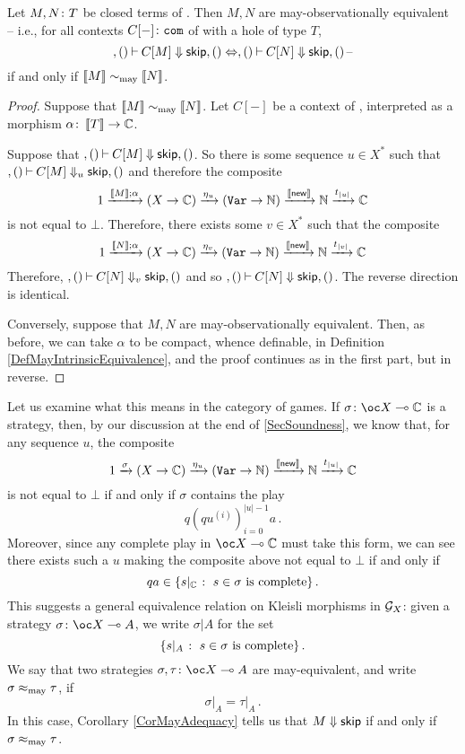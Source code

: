 \documentclass{article}
\begin{document}
\begin{theorem}
  Let $M,N\colon T$ be closed terms of \IAX. Then $M,N$ are may-observationally equivalent -- i.e., for all contexts $C[-]\colon {\mathtt{com}}$ of \IAX with a hole of type $T$, \[
    ,()\mathbin{\vdash} C[M] \Downarrow {\mathsf{skip}},() \Leftrightarrow ,()\mathbin{\vdash} C[N] \Downarrow {\mathsf{skip}},()\,\text{--}
    \]
  if and only if $\left\llbracket M\right\rrbracket \sim_{\operatorname{may}} \left\llbracket N\right\rrbracket$.
\end{theorem}
\begin{proof}
  Suppose that $\left\llbracket M\right\rrbracket\sim_{\operatorname{may}}\left\llbracket N\right\rrbracket$.  
  Let $C[-]$ be a context of \IAX, interpreted as a morphism $\alpha \colon \left\llbracket T\right\rrbracket \to \mathbb{C}$.

  Suppose that $,()\mathbin{\vdash} C[M] \Downarrow {\mathsf{skip}},()$.  
  So there is some sequence $u\in X^*$ such that $,()\mathbin{\vdash} C[M] \Downarrow_u {\mathsf{skip}},()$ and therefore the composite
  \[
    1 \xrightarrow{\left\llbracket M\right\rrbracket;\alpha}
    (X \to \mathbb{C}) \xrightarrow{\eta_u}
    ({\mathtt{Var}} \to \mathbb{N}) \xrightarrow{\left\llbracket\operatorname{{\mathsf{new}}}\right\rrbracket}
    \mathbb{N} \xrightarrow{t_{|u|}}
    \mathbb{C}
    \]
  is not equal to $\bot$.  
  Therefore, there exists some $v\in X^*$ such that the composite
  \[
    1 \xrightarrow{\left\llbracket N\right\rrbracket;\alpha}
    (X \to \mathbb{C}) \xrightarrow{\eta_v}
    ({\mathtt{Var}} \to \mathbb{N}) \xrightarrow{\left\llbracket\operatorname{{\mathsf{new}}}\right\rrbracket}
    \mathbb{N} \xrightarrow{t_{|v|}}
    \mathbb{C}
    \]
  Therefore, $,()\mathbin{\vdash} C[N] \Downarrow_v {\mathsf{skip}},()$ and so $,()\mathbin{\vdash} C[N] \Downarrow {\mathsf{skip}},()$.
  The reverse direction is identical.

  Conversely, suppose that $M,N$ are may-observationally equivalent.  
  Then, as before, we can take $\alpha$ to be compact, whence definable, in Definition \ref{DefMayIntrinsicEquivalence}, and the proof continues as in the first part, but in reverse.
\end{proof}

Let us examine what this means in the category of games.
If $\sigma\from \oc X \implies \bC$ is a strategy, then, by our discussion at the end of \sec\ref{SecSoundness}, we know that, for any sequence $u$, the composite
\[
  1 \xrightarrow{\sigma}
  (X \to \mathbb{C}) \xrightarrow{\eta_u}
  ({\mathtt{Var}} \to \mathbb{N}) \xrightarrow{\left\llbracket\operatorname{{\mathsf{new}}}\right\rrbracket}
  \mathbb{N} \xrightarrow{t_{|u|}}
  \mathbb{C}
  \]
is not equal to $\bot$ if and only if $\sigma$ contains the play
\[
  q (q u^{(i)})_{i=0}^{|u|-1} a\,.
  \]
Moreover, since any complete play in $\oc X \implies \bC$ must take this form, we can see there exists such a $u$ making the composite above not equal to $\bot$ if and only if
\[
  qa \in \{s\vert_{\mathbb{C}} \;\colon\; s\in\sigma\text{ is complete}\}\,.
  \]
This suggests a general equivalence relation on Kleisli morphisms in $\mathcal G_X$: given a strategy $\sigma\from \oc X \implies A$, we write $\sigma\vert A$ for the set
\[
  \{s\vert_A \;\colon\; s\in \sigma\text{ is complete}\}\,.
  \]
We say that two strategies $\sigma,\tau\from \oc X \implies A$ are may-equivalent, and write $\sigma\approx_{\operatorname{may}}\tau$, if
\[
  \sigma\vert_A = \tau\vert_A\,.
  \]
In this case, Corollary \ref{CorMayAdequacy} tells us that $M\Downarrow {\mathsf{skip}}$ if and only if $\sigma\approx_{\operatorname{may}}\tau$.
\end{document}

